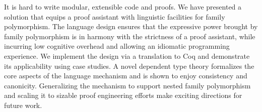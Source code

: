 It is hard to write modular, extensible code and proofs.
We have presented a solution that equips a proof assistant with
linguistic facilities for family polymorphism.
The language design ensures that the expressive power brought by family polymorphism
is in harmony with the strictness of a proof assistant, while incurring
low cognitive overhead and allowing an idiomatic programming experience.
We implement the design via a translation to Coq and demonstrate its applicability
using case studies.
A novel dependent type theory formalizes the core aspects of the language mechanism
and is shown to enjoy consistency and canonicity.
Generalizing the mechanism to support nested family polymorphism and
scaling it to sizable proof engineering efforts make exciting directions for
future work.
